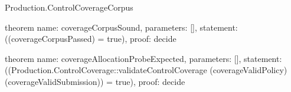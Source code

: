 \begin{lexlean}{Production.ControlCoverageCorpus}
\begin{semanticmodule}
theorem{
  name: coverageCorpusSound,
  parameters: [],
  statement: ((coverageCorpusPassed) = true),
  proof: decide{}
}

theorem{
  name: coverageAllocationProbeExpected,
  parameters: [],
  statement: ((Production.ControlCoverage::validateControlCoverage (coverageValidPolicy) (coverageValidSubmission)) = true),
  proof: decide{}
}
\end{semanticmodule}
\end{lexlean}
